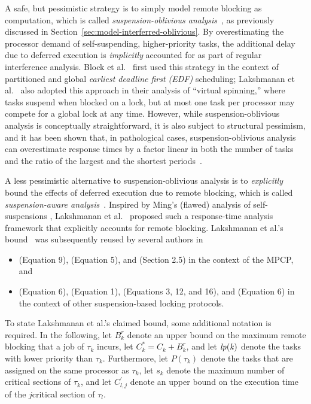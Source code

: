 A safe, but pessimistic strategy is to simply model remote blocking as computation, which is called \emph{suspension-oblivious analysis}~\cite{BA:10b}, as previously discussed in Section~\ref{sec:model-interferred-oblivious}. By overestimating the processor demand of self-suspending, higher-priority tasks, the additional delay due to deferred execution is \emph{implicitly} accounted for as part of regular interference analysis. Block et al.~\cite{block-2007} first used this strategy in the context of partitioned and global \emph{earliest deadline first (EDF)} scheduling; Lakshmanan et al.~\cite{lakshmanan-2009} also adopted this approach in their analysis of ``virtual spinning,'' where tasks suspend when blocked on a lock, but at most one task per processor may compete for a global lock at any time. However, while suspension-oblivious analysis is conceptually straightforward, it is also subject to structural pessimism, and it has been shown that, in pathological cases, suspension-oblivious analysis can overestimate response times by a factor linear in both the number of tasks and the ratio of the largest and the shortest periods~\cite{wieder-2013}.

A less pessimistic alternative to suspension-oblivious analysis is to \emph{explicitly} bound the effects of deferred execution due to remote blocking, which is called \emph{suspension-aware analysis}~\cite{BA:10b}. Inspired by Ming's (flawed) analysis of self-suspensions  \cite{MingLiRTCSA1994}, Lakshmanan et al.~\cite{lakshmanan-2009} proposed such a response-time analysis framework that explicitly accounts for remote blocking.  Lakshmanan et al.'s  bound~\cite{lakshmanan-2009} was subsequently reused by several authors in
\begin{itemize}
\item \cite{zeng-2011} (Equation 9), \cite{han-2014} (Equation 5), and \cite{yang-2014} (Section 2.5) in the context of the MPCP, and
\item \cite{yang-2013} (Equation 6), \cite{bbb-2013} (Equation 1), \cite{carminati-2014} (Equations 3, 12, and 16), and \cite{kim-2014} (Equation 6)  in the context of other suspension-based locking protocols.
\end{itemize}

To state  Lakshmanan et al.'s claimed bound, some additional notation is required. In the following, let $B_k^r$ denote an upper bound on the maximum remote blocking that a job of $\tau_k$ incurs, let $C_k^{\ast} = C_k + B_k^r$, and let $\mathit{lp(k)}$ denote the tasks with lower priority than $\tau_k$. Furthermore, let $P(\tau_k)$ denote the tasks that are assigned on the same processor as $\tau_k$, let $s_k$ denote the maximum number of critical sections of $\tau_k$, and let $C_{l,j}^{\prime}$ denote an upper bound on the execution time of the $j$\xth critical section of $\tau_l$.

